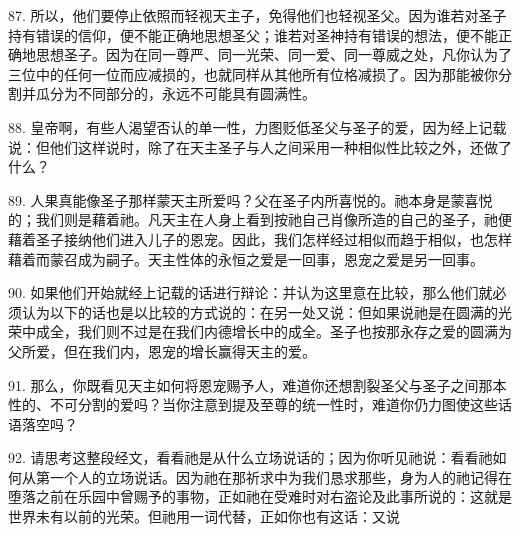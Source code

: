 87. 所以，他们要停止依照而轻视天主子，免得他们也轻视圣父。因为谁若对圣子持有错误的信仰，便不能正确地思想圣父；谁若对圣神持有错误的想法，便不能正确地思想圣子。因为在同一尊严、同一光荣、同一爱、同一尊威之处，凡你认为了三位中的任何一位而应减损的，也就同样从其他所有位格减损了。因为那能被你分割并瓜分为不同部分的，永远不可能具有圆满性。\par

\par

88. 皇帝啊，有些人渴望否认的单一性，力图贬低圣父与圣子的爱，因为经上记载说：但他们这样说时，除了在天主圣子与人之间采用一种相似性比较之外，还做了什么？\par

89. 人果真能像圣子那样蒙天主所爱吗？父在圣子内所喜悦的。祂本身是蒙喜悦的；我们则是藉着祂。凡天主在人身上看到按祂自己肖像所造的自己的圣子，祂便藉着圣子接纳他们进入儿子的恩宠。因此，我们怎样经过相似而趋于相似，也怎样藉着而蒙召成为嗣子。天主性体的永恒之爱是一回事，恩宠之爱是另一回事。\par

90. 如果他们开始就经上记载的话进行辩论：并认为这里意在比较，那么他们就必须认为以下的话也是以比较的方式说的：在另一处又说：但如果说祂是在圆满的光荣中成全，我们则不过是在我们内德增长中的成全。圣子也按那永存之爱的圆满为父所爱，但在我们内，恩宠的增长赢得天主的爱。\par

91. 那么，你既看见天主如何将恩宠赐予人，难道你还想割裂圣父与圣子之间那本性的、不可分割的爱吗？当你注意到提及至尊的统一性时，难道你仍力图使这些话语落空吗？\par

92. 请思考这整段经文，看看祂是从什么立场说话的；因为你听见祂说：看看祂如何从第一个人的立场说话。因为祂在那祈求中为我们恳求那些，身为人的祂记得在堕落之前在乐园中曾赐予的事物，正如祂在受难时对右盗论及此事所说的：这就是世界未有以前的光荣。但祂用一词代替，正如你也有这话：又说\par


